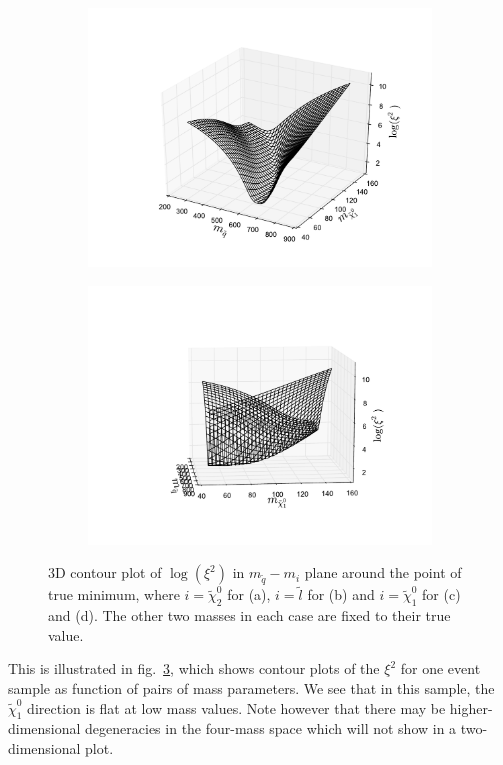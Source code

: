 \documentclass[twoside,english]{uiofysmaster}
\begin{document}
\begin{figure}[hbt]
	\begin{subfigure}[b]{0.49\textwidth}
		\includegraphics[width=\textwidth]{figures/3D_plot_xisquared_25_herwig_events_squark-chi1.pdf} 
		\caption{}
		\label{fig:3D_masses3}
	\end{subfigure}
	\begin{subfigure}[b]{0.49\textwidth}
		\includegraphics[width=\textwidth]{figures/3D_plot_xisquared_25_herwig_events_squark-chi1_rotated.pdf} 
		\caption{}
		\label{fig:3D_masses4}
	\end{subfigure}
	\caption{3D contour plot of $\log(\xi^2)$ in $m_{\tilde q}-m_i$ plane around the point of true minimum, where $i=\tilde \chi_2^0$ for (a), $i=\tilde l$ for (b) and $i=\tilde \chi_1^0$ for (c) and (d). The other two masses in each case are fixed to their true value.}
	\label{fig:3D_masses}
\end{figure}
This is illustrated in fig.\ \ref{fig:3D_masses}, which shows contour plots of the $\xi^2$ for one event sample as function of pairs of mass parameters. We see that in this sample, the $\tilde \chi_1^0$ direction is flat at low mass values. Note however that there may be higher-dimensional degeneracies in the four-mass space which will not show in a two-dimensional plot.
\end{document}
